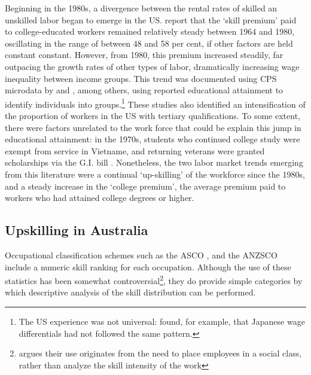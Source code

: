 Beginning in the 1980s, a divergence between the rental rates of skilled an unskilled labor began to emerge in the US. \citet{Acemoglu2011} report that the `skill premium' paid to college-educated workers remained relatively steady between 1964 and 1980, oscillating in the range of between 48 and 58 per cent, if other factors are held constant constant. However, from 1980, this premium increased steadily, far outpacing the growth rates of other types of labor, dramatically increasing wage inequality between income groups. This trend was documented using CPS microdata by \citet{Karoly1992} and \citet{Katz1989}, among others, using reported educational attainment to identify individuals into groups.\footnote{The US experience was not universal: \citet{Katz1989} found, for example, that Japanese wage differentials had not followed the same pattern.} These studies also identified an intensification of the proportion of workers in the US with tertiary qualifications. To some extent, there were factors unrelated to the work force that could be explain this jump in educational attainment: in the 1970s, students who continued college study were exempt from service in Vietname, and returning veterans were granted scholarships via the G.I. bill \citet{Acemoglu2011}. Nonetheless, the two labor market trends emerging from this literature were a continual `up-skilling' of the workforce since the 1980s, and a steady increase in the `college premium', the average premium paid to workers who had attained college degrees or higher.

\subsection{Upskilling in Australia}


Occupational classification schemes such as the ASCO \citep{Castles1986}, and the ANZSCO \citep{Trewin2006} include a numeric skill ranking for each occupation. Although the use of these statistics has been somewhat controversial\footnote{\citet{Cully1999} argues their use originates from the need to place employees in a social class, rather than analyze the skill intensity of the work}, they do provide simple categories by which descriptive analysis of the skill distribution can be performed. 

